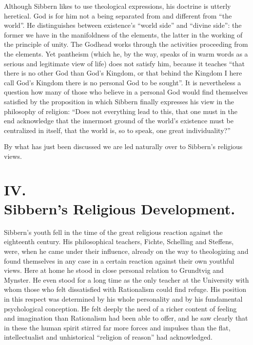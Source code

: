 \documentclass[12pt,a4paper,openany]{book}
\newcommand{\opage}[1]{\marginnote{\footnotesize\textit{[#1]}}}
\begin{document}
Although Sibbern likes to use theological expressions,
his doctrine is utterly heretical. God is for him not a being
separated from and different from ``the world''. He distinguishes between
existence's ``world side'' and ``divine side'': the former we have
in the manifoldness of the elements, the latter in the working of the principle of unity.
The Godhead works through the activities proceeding from the elements.
Yet pantheism (which he, by the way,
speaks of in warm words as a serious and legitimate view of life)
does not satisfy him, because it teaches ``that there is no other God than God's
\opage{91}Kingdom, or that behind the Kingdom I here call God's Kingdom
there is no personal God to be sought''. It is nevertheless a
question how many of those who believe in a personal
God would find themselves satisfied by the proposition in
which Sibbern finally expresses his view in the philosophy of religion: ``Does not
everything lead to this, that one must in the end
acknowledge that the innermost ground of the world's existence must be
centralized in itself, that the world is, so to speak, one great individuality?''

By what has just been discussed we are led naturally over to Sibbern's
religious views.

\section*{IV.\\  Sibbern's Religious Development.}

Sibbern's youth fell in the time of the great religious
reaction against the eighteenth century. His philosophical
teachers, Fichte, Schelling and Steffens, were, when he came under
their influence, already on the way to theologizing and
found themselves in any case in a certain reaction against their own
youthful views. Here at home he stood in close personal
relation to Grundtvig and Mynster. He even stood for a long
time as the only teacher at the University with whom those
who felt dissatisfied with Rationalism could find
refuge. His position in this respect was determined by
his whole personality and by his fundamental psychological
conception. He felt deeply the need of a richer content of feeling and
imagination than Rationalism had been able to offer, and he
saw clearly that in these the human spirit stirred far
more forces and impulses than the flat, intellectualist and
unhistorical ``religion of reason'' had acknowledged.
\end{document}
